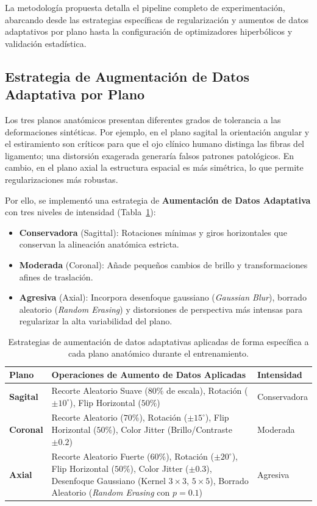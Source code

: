 La metodología propuesta detalla el pipeline completo de experimentación, abarcando desde las estrategias específicas de regularización y aumentos de datos adaptativos por plano hasta la configuración de optimizadores hiperbólicos y validación estadística.

\subsection{Estrategia de Augmentación de Datos Adaptativa por Plano}
Los tres planos anatómicos presentan diferentes grados de tolerancia a las deformaciones sintéticas. Por ejemplo, en el plano sagital la orientación angular y el estiramiento son críticos para que el ojo clínico humano distinga las fibras del ligamento; una distorsión exagerada generaría falsos patrones patológicos. En cambio, en el plano axial la estructura espacial es más simétrica, lo que permite regularizaciones más robustas.

Por ello, se implementó una estrategia de \textbf{Aumentación de Datos Adaptativa} con tres niveles de intensidad (Tabla~\ref{tab:augmentations}):
\begin{itemize}
    \item \textbf{Conservadora} (Sagittal): Rotaciones mínimas y giros horizontales que conservan la alineación anatómica estricta.
    \item \textbf{Moderada} (Coronal): Añade pequeños cambios de brillo y transformaciones afines de traslación.
    \item \textbf{Agresiva} (Axial): Incorpora desenfoque gaussiano (\textit{Gaussian Blur}), borrado aleatorio (\textit{Random Erasing}) y distorsiones de perspectiva más intensas para regularizar la alta variabilidad del plano.
\end{itemize}

\begin{table}[htbp]
\centering
\caption{Estrategias de aumentación de datos adaptativas aplicadas de forma específica a cada plano anatómico durante el entrenamiento.}
\label{tab:augmentations}
\begin{tabular}{lp{9cm}l}
\hline
\textbf{Plano} & \textbf{Operaciones de Aumento de Datos Aplicadas} & \textbf{Intensidad} \\ \hline
\textbf{Sagital} & Recorte Aleatorio Suave ($80\%$ de escala), Rotación ($\pm 10^\circ$), Flip Horizontal ($50\%$) & Conservadora \\
\textbf{Coronal} & Recorte Aleatorio ($70\%$), Rotación ($\pm 15^\circ$), Flip Horizontal ($50\%$), Color Jitter (Brillo/Contraste $\pm 0.2$) & Moderada \\
\textbf{Axial}   & Recorte Aleatorio Fuerte ($60\%$), Rotación ($\pm 20^\circ$), Flip Horizontal ($50\%$), Color Jitter ($\pm 0.3$), Desenfoque Gaussiano (Kernel $3\times3$, $5\times5$), Borrado Aleatorio (\textit{Random Erasing} con $p=0.1$) & Agresiva \\ \hline
\end{tabular}
\end{table}

